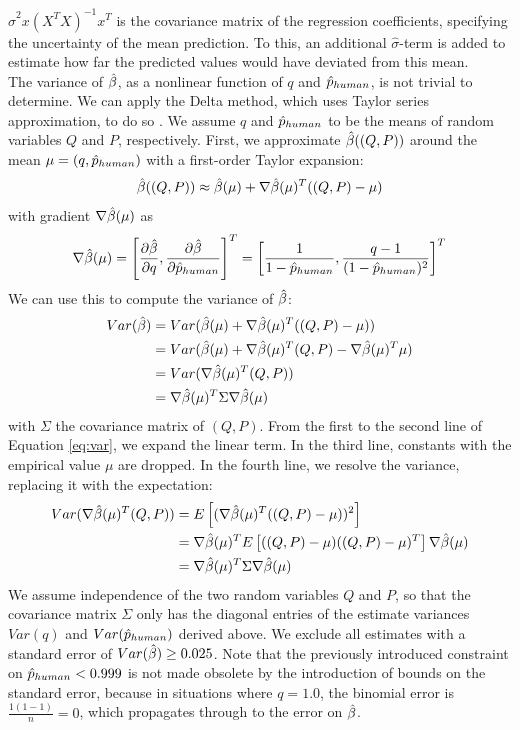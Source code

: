 $\hat{\sigma}^2x(X^TX)^{-1}x^T $ is the covariance matrix of the regression coefficients, specifying the uncertainty of the mean prediction. 
To this, an additional $\hat{\sigma}$-term is added to estimate how far the predicted values would have deviated from this mean.
\\
The variance of $\hat{\beta}$, as a nonlinear function of $q$ and $\hat{p}_{human}$, is not trivial to determine.
We can apply the Delta method, which uses Taylor series approximation, to do so \cite{ver2012invented}.
We assume $q$ and $\hat{p}_{human}$ to be the means of random variables $Q$ and $P$, respectively.
First, we approximate $\hat{\beta}((Q,P))$ around the mean $\mu=(q, \hat{p}_{human})$ with a first-order Taylor expansion:
\begin{equation}
    \hat{\beta}((Q,P)) \approx \hat{\beta}(\mu) + \nabla\hat{\beta}(\mu)^T((Q,P)-\mu)
\end{equation}
with gradient $\nabla \hat{\beta}(\mu)$ as
\begin{equation}
    \nabla \hat{\beta}(\mu)= \left[ \frac{\partial\hat{\beta}}{\partial q}, \frac{\partial\hat{\beta}}{\partial \hat{p}_{human}}\right]^T = \left[ \frac{1}{1-\hat{p}_{human}}, \frac{q-1}{(1-\hat{p}_{human})^2}\right]^T 
\end{equation}
We can use this to compute the variance of $\hat{\beta}$:
\begin{equation}\label{eq:var}
    \begin{split}
        Var(\hat{\beta}) &= Var(\hat{\beta}(\mu) + \nabla\hat{\beta}(\mu)^T((Q,P)-\mu))\\
        &= Var(\hat{\beta}(\mu) + \nabla\hat{\beta}(\mu)^T(Q,P)-\nabla\hat{\beta}(\mu)^T\mu)\\
        &= Var(\nabla\hat{\beta}(\mu)^T(Q,P))\\
        &= \nabla\hat{\beta}(\mu)^T\Sigma\nabla\hat{\beta}(\mu)
    \end{split}
\end{equation}
with $\Sigma$ the covariance matrix of $(Q,P)$.
From the first to the second line of Equation \ref{eq:var}, we expand the linear term. 
In the third line, constants with the empirical value $\mu$ are dropped.
In the fourth line, we resolve the variance, replacing it with the expectation: 
\begin{equation}
    \begin{split}
        Var(\nabla\hat{\beta}(\mu)^T(Q,P)) &=E\left[(\nabla\hat{\beta}(\mu)^T((Q,P)-\mu))^2\right]\\
        &=\nabla\hat{\beta}(\mu)^TE\left[((Q,P)-\mu)((Q,P)-\mu)^T\right]\nabla\hat{\beta}(\mu)\\
        &=\nabla\hat{\beta}(\mu)^T\Sigma\nabla\hat{\beta}(\mu)
    \end{split}
\end{equation}
We assume independence of the two random variables $Q$ and $P$, so that the covariance matrix $\Sigma$ only has the diagonal entries of the estimate variances $Var(q)$ and $Var(\hat{p}_{human})$ derived above. 
We exclude all estimates with a standard error of $Var(\hat{\beta})\ge 0.025$.
Note that the previously introduced constraint on $\hat{p}_{human}<0.999$ is not made obsolete by the introduction of bounds on the standard error, because in situations where $q=1.0$, the binomial error is $\frac{1(1-1)}{n}=0$, which propagates through to the error on $\hat{\beta}$.

